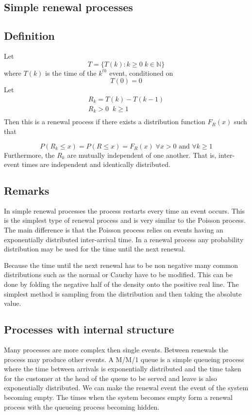 \subsection{Simple renewal processes}

\subsection{Definition}

Let
\[ T = \{T(k) : k \geq 0 \; k \in {\mathbb N} \} \]
where $T(k)$ is the time of the $k^{th}$ event, conditioned on
\[ T(0) = 0 \]
Let
\[ \begin{array}{c}
R_k = T(k) - T(k-1) \\
R_k > 0 \; \;  k \geq 1 \\
\end{array}
\]
Then this is a renewal process if there exists a
distribution function $F_R(x)$ such that

\[ P(R_k \leq x) = P(R \leq x) = F_R(x) \; \forall x > 0 \mbox{ and } \forall k\geq 1 \]
Furthermore, the $R_k$ are mutually independent of one another.  That
is, inter-event times are independent and identically distributed.

\subsection{Remarks}

In simple renewal processes the process restarts every time an event
occurs.  This is the simplest type of renewal process and is very
similar to the Poisson process.  The main difference is that the
Poisson process relies on events having an exponentially distributed
inter-arrival time.  In a renewal process any probability distribution
may be used for the time until the next renewal.

Because the time until the next renewal has to be non negative
many common distributions such as the normal or Cauchy have to be
modified.  This can be done by folding the negative half of the
density onto the positive real line.  The simplest method is sampling
from the distribution and then taking the absolute value.

\subsection{Processes with internal structure}

Many processes are more complex then single events.  Between renewals
the process may produce other events.  A M/M/1 queue is a simple
queueing process where the time between arrivals is exponentially
distributed and the time taken for the customer at the head of the
queue to be served and leave is also exponentially distributed.  We
can make the renewal event the event of the system becoming empty.
The times when the system becomes empty form a renewal process with
the queueing process becoming hidden.

